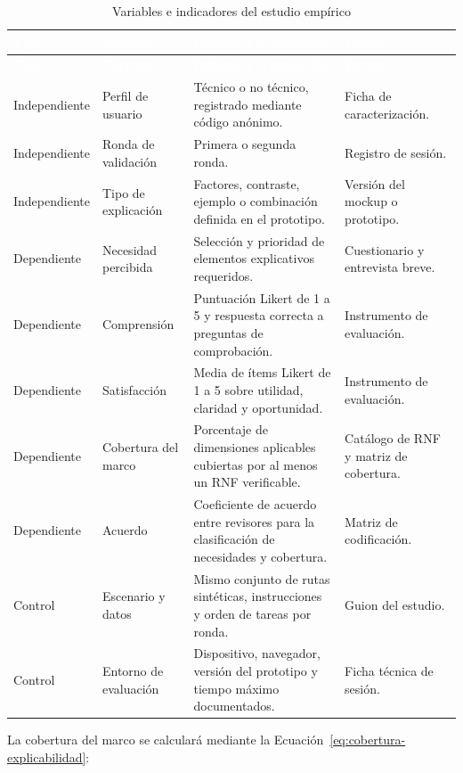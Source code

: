 \documentclass[12pt,a4paper]{article}
\begin{document}
\begin{longtable}{L{2.45cm} L{3.0cm} L{4.45cm} L{4.15cm}}
\caption{Variables e indicadores del estudio empírico}\label{tab:variables-estudio}\\
\textcolor{white}{\textbf{Tipo}} &
\textcolor{white}{\textbf{Variable}} &
\textcolor{white}{\textbf{Indicador o medición}} &
\textcolor{white}{\textbf{Fuente}}\\
\endfirsthead
{}
\textcolor{white}{\textbf{Tipo}} &
\textcolor{white}{\textbf{Variable}} &
\textcolor{white}{\textbf{Indicador o medición}} &
\textcolor{white}{\textbf{Fuente}}\\
\endhead
Independiente & Perfil de usuario & Técnico o no técnico, registrado mediante código anónimo. & Ficha de caracterización.\\
Independiente & Ronda de validación & Primera o segunda ronda. & Registro de sesión.\\
Independiente & Tipo de explicación & Factores, contraste, ejemplo o combinación definida en el prototipo. & Versión del mockup o prototipo.\\
Dependiente & Necesidad percibida & Selección y prioridad de elementos explicativos requeridos. & Cuestionario y entrevista breve.\\
Dependiente & Comprensión & Puntuación Likert de 1 a 5 y respuesta correcta a preguntas de comprobación. & Instrumento de evaluación.\\
Dependiente & Satisfacción & Media de ítems Likert de 1 a 5 sobre utilidad, claridad y oportunidad. & Instrumento de evaluación.\\
Dependiente & Cobertura del marco & Porcentaje de dimensiones aplicables cubiertas por al menos un RNF verificable. & Catálogo de RNF y matriz de cobertura.\\
Dependiente & Acuerdo & Coeficiente de acuerdo entre revisores para la clasificación de necesidades y cobertura. & Matriz de codificación.\\
Control & Escenario y datos & Mismo conjunto de rutas sintéticas, instrucciones y orden de tareas por ronda. & Guion del estudio.\\
Control & Entorno de evaluación & Dispositivo, navegador, versión del prototipo y tiempo máximo documentados. & Ficha técnica de sesión.\\
\end{longtable}

La cobertura del marco se calculará mediante la Ecuación~\ref{eq:cobertura-explicabilidad}:
\end{document}
